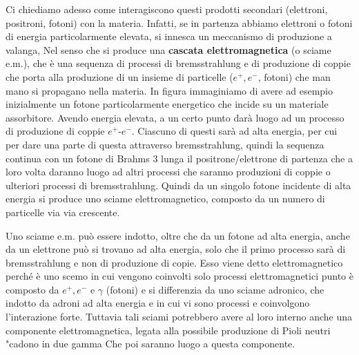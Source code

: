 Ci chiediamo adesso come interagiscono questi prodotti secondari (elettroni, positroni, fotoni) con la materia. Infatti, se in partenza abbiamo elettroni o fotoni di energia particolarmente elevata, si innesca un meccanismo di produzione a valanga, Nel senso che si produce una \textbf{cascata elettromagnetica} (o sciame e.m.), che è una sequenza di processi di bremsstrahlung e di produzione di coppie che porta alla produzione di un insieme di particelle ($e^+, e^-$, fotoni) che man mano si propagano nella materia. In figura immaginiamo di avere ad esempio inizialmente un fotone particolarmente energetico che incide su un materiale assorbitore. Avendo energia elevata, a un certo punto darà luogo ad un processo di produzione di coppie $e^+$-$e^-$. Ciascuno di questi sarà ad alta energia, per cui per dare una parte di questa attraverso bremsstrahlung, quindi la sequenza continua con un fotone di Brahms 3 lunga il positrone/elettrone di partenza che a loro volta daranno luogo ad altri processi che saranno produzioni di coppie o ulteriori processi di bremsstrahlung. Quindi da un singolo fotone incidente di alta energia si produce uno sciame elettromagnetico, composto da un numero di particelle via via crescente.

Uno sciame e.m. può essere indotto, oltre che da un fotone ad alta energia, anche da un elettrone può si trovano ad alta energia, solo che il primo processo sarà di bremsstrahlung e non di produzione di copie. Esso viene detto elettromagnetico perché è uno scemo in cui vengono coinvolti solo processi elettromagnetici punto è composto da $ e^+,e^-$ e $\gamma$ (fotoni) e si differenzia da uno sciame adronico, che indotto da adroni ad alta energia e in cui vi sono processi e coinvolgono l'interazione forte. Tuttavia tali sciami potrebbero avere al loro interno anche una componente elettromagnetica, legata alla possibile produzione di Pioli neutri "cadono in due gamma Che poi saranno luogo a questa componente.

